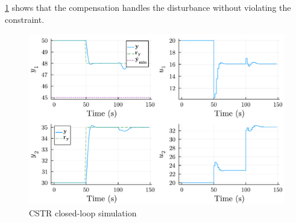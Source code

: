 \cref{fig:plot2_LinMPC} shows that the compensation handles the disturbance without violating the constraint.

\begin{figure}
    \centering
    \includegraphics[width=\columnwidth]{fig/plot2_LinMPC.pdf}
    \caption{CSTR closed-loop simulation}
    \label{fig:plot2_LinMPC}
\end{figure}
